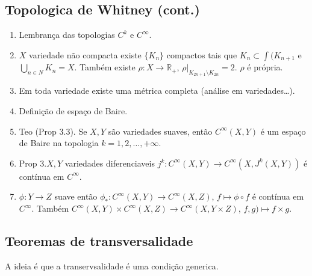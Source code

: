 \subsection{Topologica de Whitney (cont.)}

\begin{enumerate}
\item Lembrança das topologias \(C^k\) e \(C^\infty\).
\item \(X\) variedade não compacta existe \(\{ K_n\}\) compactos tais que \(K_n \subset \int (K_{n+1}\) e \(\bigcup_{n \in N} K_n=X\). Também existe \(\rho: X \to \mathbb{R}_+\),  \(\rho|_{K_{2n+1}\setminus K_{2n}}=2\). \(\rho\) é própria.
\item  Em toda variedade existe uma métrica completa (análise em variedades…).
\item Definição de espaço de Baire.
\item Teo (Prop 3.3). Se \(X, Y\) são variedades suaves, então \(C^\infty(X,Y)\) é um espaço de Baire na topologia \(k=1,2,\ldots,+\infty\).
\item Prop 3.\(X, Y\) variedades diferenciaveis \( j^k : C^\infty(X,Y)\to C^\infty(X, J^k(X,Y))\) é contínua em \(C^\infty\).
\item  \(\phi: Y \to Z \) suave então \(\phi_*: C^\infty(X,Y)\to C^\infty(X,Z)\), \(f \mapsto \phi \circ f\) é contínua em \(C^\infty\). Também \(C^\infty(X,Y) \times C^\infty(X,Z)\to C^\infty(X, Y \times Z)\), \(f, g) \mapsto f \times g\).
\end{enumerate}

\subsection{Teoremas de transversalidade}

A ideia é que a transervsalidade é uma condição generica.

